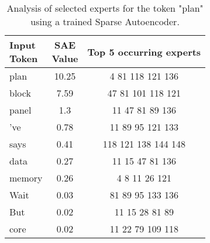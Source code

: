 \begin{table}[]
    \centering
    \begin{tabular}{lcc}
        \makecell{Input \\ Token} & \makecell{SAE \\ Value}  & Top 5 occurring experts \\
        \toprule
        plan & 10.25 & 4 \hfill 81 \hfill 118 \hfill 121 \hfill 136\\
        block & 7.59 & 47 \hfill 81 \hfill 101 \hfill 118 \hfill 121\\
        panel & 1.3 & 11 \hfill 47 \hfill 81 \hfill 89 \hfill 136\\
        've & 0.78 & 11 \hfill 89 \hfill 95 \hfill 121 \hfill 133\\
        says & 0.41 & 118 \hfill 121 \hfill 138 \hfill 144 \hfill 148\\
        data & 0.27 & 11 \hfill 15 \hfill 47 \hfill 81 \hfill 136\\
        memory & 0.26 & 4 \hfill 8 \hfill 11 \hfill 26 \hfill 121\\
        Wait & 0.03 & 81 \hfill 89 \hfill 95 \hfill 133 \hfill 136\\
        But & 0.02 & 11 \hfill 15 \hfill 28 \hfill 81 \hfill 89\\
        core & 0.02 & 11 \hfill 22 \hfill 79 \hfill 109 \hfill 118\\
        \bottomrule
    \end{tabular}
    \caption{Analysis of selected experts for the token "plan" using a trained Sparse Autoencoder.}
    \label{tab:sae_plan}
\end{table}

